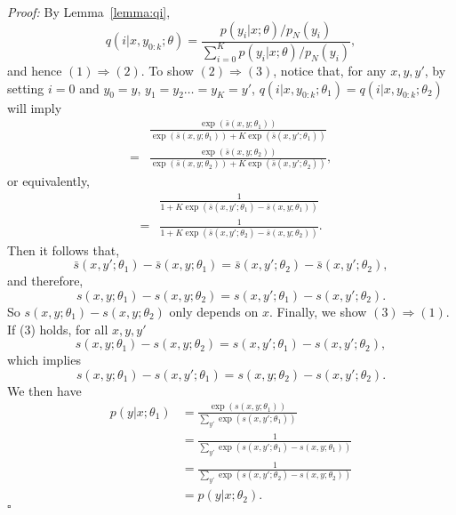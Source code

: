 \documentclass[11pt,a4paper]{article}
\newcommand{\qed}{\square}
\newcommand{\str}[3]{s(#1, #2; #3)}
\newcommand{\ssf}[3]{\bar{s}(#1, #2; #3)}
\begin{document}
{\em Proof:} 
By Lemma~\ref{lemma:qi},
\[
  q(i | x, y_{0:k}; \theta)  = \frac{p(y_i | x; \theta) / p_N(y_i)}{\sum_{i=0}^K p(y_i | x; \theta) / p_N(y_i)  },
\]
and hence $(1)\Rightarrow(2)$. 
To show $(2)\Rightarrow (3)$, notice that, for any $x, y, y'$, by setting $i = 0$ and $y_0 = y$, $y_1 = y_2 \ldots = y_K = y'$, $q(i | x, y_{0:k}; \theta_1) = q(i | x,
y_{0:k}; \theta_2)$ will imply
\begin{equation*}
\begin{aligned}
&  \frac{\exp( \ssf{x}{y}{\theta_1} ) }{\exp ( \ssf{x}{y}{\theta_1} ) + K \exp ( \ssf{x}{
y'}{\theta_1} )} \\
=  & \frac{\exp( \ssf{x}{y}{\theta_2} )}{\exp( \ssf{x}{y}{\theta_2} ) + K \exp( \ssf{x}{y'}{\theta_2} )},
\end{aligned}
\end{equation*}
or equivalently,
\begin{equation*}
\begin{aligned}
& \frac{ 1 }{ 1 + K \exp ( \ssf{x}{
y'}{\theta_1} -  \ssf{x}{y}{\theta_1} )} \\
= &  \frac{ 1 }{ 1 + K \exp ( \ssf{x}{
y'}{\theta_2} -  \ssf{x}{y}{\theta_2} )}. 
\end{aligned}
\end{equation*}
Then it follows that, 
\[
   \ssf{x}{y'}{\theta_1} - \ssf{x}{y}{\theta_1} = 
 \ssf{x}{y'}{\theta_2} - \ssf{x}{y'}{\theta_2},
\]
and therefore, 
\[
  \str{x}{y}{\theta_1} - \str{x}{y}{\theta_2} =
\str{x}{y'}{\theta_1} - \str{x}{y'}{\theta_2}.
\]
So $\str{x}{y}{\theta_1} - \str{x}{y}{\theta_2}$ only depends on $x$. 
Finally, we show $(3)\Rightarrow (1)$. If (3) holds, for all $x, y, y'$
\[
   \str{x}{y}{\theta_1} - \str{x}{y}{\theta_2} = \str{x}{y'}{\theta_1} - \str{x}{y'}{\theta_2},
\]
which implies
\[
  \str{x}{y}{\theta_1} - \str{x}{y'}{\theta_1} =
\str{x}{y}{\theta_2} - \str{x}{y'}{\theta_2}.
\]
We then have 
\begin{equation*}
  \begin{aligned}
    p(y | x; \theta_1)  &=  \frac{ \exp(\str{x}{y}{\theta_1})}{\sum_{y'}
  \exp(\str{x}{y'}{\theta_1})}\\
&= \frac{1}{\sum_{y'}
  \exp(\str{x}{y'}{\theta_1} - \str{x}{y}{\theta_1})}\\
&= \frac{1}{\sum_{y'}
  \exp(\str{x}{y'}{\theta_2} - \str{x}{y}{\theta_2})}\\
&= p(y | x; \theta_2). 
  \end{aligned}
\end{equation*}
$\qed$
\end{document}
